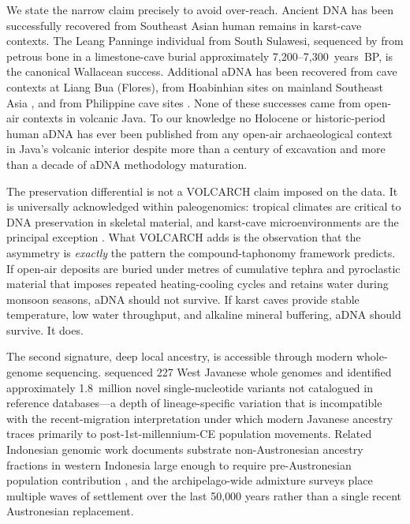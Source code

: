 \documentclass[12pt,a4paper]{article}
\begin{document}
We state the narrow claim precisely to avoid over-reach. Ancient DNA has been successfully recovered from Southeast Asian human remains in karst-cave contexts. The Leang Panninge individual from South Sulawesi, sequenced by \citet{carlhoff2021} from petrous bone in a limestone-cave burial approximately 7{,}200--7{,}300~years~BP, is the canonical Wallacean success. Additional aDNA has been recovered from cave contexts at Liang Bua (Flores), from Hoabinhian sites on mainland Southeast Asia \citep{mccoll2018,lipson2018}, and from Philippine cave sites \citep{larena2021}. None of these successes came from open-air contexts in volcanic Java. To our knowledge no Holocene or historic-period human aDNA has ever been published from any open-air archaeological context in Java's volcanic interior despite more than a century of excavation and more than a decade of aDNA methodology maturation.

The preservation differential is not a VOLCARCH claim imposed on the data. It is universally acknowledged within paleogenomics: tropical climates are critical to DNA preservation in skeletal material, and karst-cave microenvironments are the principal exception \citep{carlhoff2021}. What VOLCARCH adds is the observation that the asymmetry is \textit{exactly} the pattern the compound-taphonomy framework predicts. If open-air deposits are buried under metres of cumulative tephra and pyroclastic material that imposes repeated heating-cooling cycles and retains water during monsoon seasons, aDNA should not survive. If karst caves provide stable temperature, low water throughput, and alkaline mineral buffering, aDNA should survive. It does.

The second signature, deep local ancestry, is accessible through modern whole-genome sequencing. \citet{maulana2024} sequenced 227 West Javanese whole genomes and identified approximately 1.8~million novel single-nucleotide variants not catalogued in reference databases---a depth of lineage-specific variation that is incompatible with the recent-migration interpretation under which modern Javanese ancestry traces primarily to post-1st-millennium-CE population movements. Related Indonesian genomic work documents substrate non-Austronesian ancestry fractions in western Indonesia large enough to require pre-Austronesian population contribution \citep{lipson2014}, and the archipelago-wide admixture surveys \citep{lipson2018,larena2021} place multiple waves of settlement over the last 50{,}000 years rather than a single recent Austronesian replacement.
\end{document}

